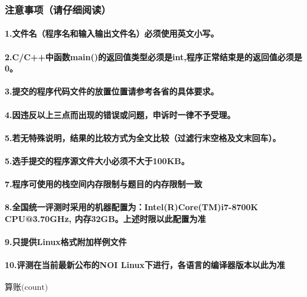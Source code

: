 \documentclass[final,11pt,oneside,UTF8]{report}
\begin{document}
\begin{spacing}{0}
    \subsubsection{注意事项（请仔细阅读）}
    \paragraph{1.文件名（程序名和输入输出文件名）必须使用英文小写。}
    \paragraph{2.C/C++中函数main()的返回值类型必须是int,程序正常结束是的返回值必须是0。}
    \paragraph{3.提交的程序代码文件的放置位置请参考各省的具体要求。}
    \paragraph{4.因违反以上三点而出现的错误或问题，申诉时一律不予受理。}
    \paragraph{5.若无特殊说明，结果的比较方式为全文比较（过滤行末空格及文末回车）。}
    \paragraph{5.选手提交的程序源文件大小必须不大于100KB。}
    \paragraph{7.程序可使用的栈空间内存限制与题目的内存限制一致}
    \paragraph{8.全国统一评测时采用的机器配置为：Intel(R)Core(TM)i7-8700K CPU@3.70GHz,
        内存32GB。上述时限以此配置为准}
    \paragraph{9.只提供Linux格式附加样例文件}
    \paragraph{10.评测在当前最新公布的NOI Linux下进行，各语言的编译器版本以此为准}
    \paragraph{}
\end{spacing}
\newpage
\centerline{\LARGE{$\textbf{算账}\text{(count)}$}}
\end{document}
